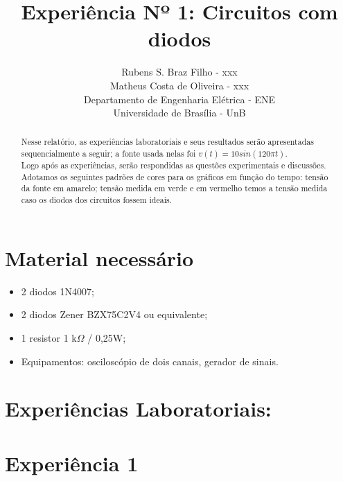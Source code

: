 \documentclass[10pt, final, a4paper]{IEEEtran} %
\begin{document}
	\title{Experiência Nº 1: Circuitos com diodos}
	\author{
		Rubens S. Braz Filho - xxx\\
		Matheus Costa de Oliveira - xxx\\
		Departamento de Engenharia Elétrica - ENE\\
		Universidade de Brasília - UnB
	}
\maketitle

\begin{abstract}
 Nesse relatório, as experiências laboratoriais e seus resultados serão apresentadas sequencialmente a seguir; a fonte usada nelas foi $v(t)=10sin(120 \pi t)$.\\
 Logo após as experiências, serão respondidas as questões experimentais e discussões.\\
 Adotamos os seguintes padrões de cores para os gráficos em função do tempo: tensão da fonte em amarelo; tensão medida em verde e em vermelho temos a tensão medida caso os diodos dos circuitos fossem ideais.
\end{abstract}

\section{Material necessário}
\vspace{0.2cm}

\begin{itemize}
	\item 2 diodos 1N4007;
	
	\item 2 diodos Zener BZX75C2V4 ou equivalente;
	
	\item 1 resistor 1 k$\Omega$ / 0,25W;
	
	\item Equipamentos: osciloscópio de dois canais, gerador de sinais.
\end{itemize}
\FloatBarrier

\section*{Experiências Laboratoriais:}
\vspace{0.5cm}

\section{Experiência 1}
\end{document}
